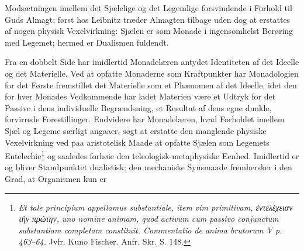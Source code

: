 \documentclass[12pt,a4paper]{book}
\begin{document}
\setcounter{footnote}{0}
Modsætningen imellem det Sjælelige og det Legemlige forsvindende i Forhold til
Guds Almagt; først hos Leibnitz træder Almagten tilbage uden dog at erstattes af
nogen physisk Vexelvirkning: Sjælen er som Monade i ingensomhelst Berøring med
Legemet; hermed er Dualismen fuldendt.

Fra en dobbelt Side har imidlertid Monadelæren antydet Identiteten af det Ideelle
og det Materielle. Ved at opfatte Monaderne som Kraftpunkter har Monadologien for
det Første fremstillet det Materielle som et Phænomen af det Ideelle, idet den
for hver Monades Vedkommende har ladet Materien være et Udtryk for det Passive i
dens individuelle Begrændsning, et Resultat af dens egne dunkle, forvirrede
Forestillinger. Endvidere har Monadelæren, hvad Forholdet imellem Sjæl og Legeme
særligt angaaer, søgt at erstatte den manglende physiske Vexelvirkning ved paa
aristotelisk Maade at opfatte Sjælen som Legemets Entelechie\footnote{\textit{Et
tale principium appellamus substantiale, item vim primitivam, ἐντελέχειαν τὴν
πρώτην, uno nomine \emph{animam}, quod activum cum passivo conjunctum substantiam
completam constituit. Commentatio de anima brutorum V p. 463--64.} Jvfr. Kuno
Fischer. Anfr. Skr. S. 148.} og saaledes forhøie den
teleologisk-metaphysiske Eenhed. Imidlertid er og bliver Standpunktet
dualistisk; den mechaniske Synsmaade fremhersker i den Grad, at Organismen kun er
\end{document}
